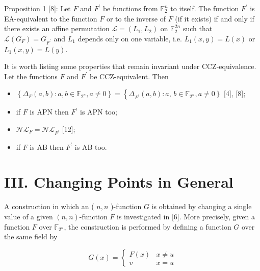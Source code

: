 \documentclass[10pt]{article}
\begin{document}
Proposition 1 [8]: Let $F$ and $F^{\prime}$ be functions from $\mathbb{F}_{2}^{n}$ to itself. The function $F^{\prime}$ is EA-equivalent to the function $F$ or to the inverse of $F$ (if it exists) if and only if there exists an affine permutation $\mathcal{L}=\left(L_{1}, L_{2}\right)$ on $\mathbb{F}_{2}^{2 n}$ such that $\mathcal{L}\left(G_{F}\right)=G_{F^{\prime}}$ and $L_{1}$ depends only on one variable, i.e. $L_{1}(x, y)=L(x)$ or $L_{1}(x, y)=L(y)$.

It is worth listing some properties that remain invariant under CCZ-equivalence. Let the functions $F$ and $F^{\prime}$ be CCZ-equivalent. Then

\begin{itemize}
  \item $\left\{\Delta_{F}(a, b): a, b \in \mathbb{F}_{2^{n}}, a \neq 0\right\}=\left\{\Delta_{F^{\prime}}(a, b): a\right.$, $\left.b \in \mathbb{F}_{2^{n}}, a \neq 0\right\}$ [4], [8];
  \item if $F$ is APN then $F^{\prime}$ is APN too;
  \item $\mathcal{N} \mathcal{L}_{F}=\mathcal{N} \mathcal{L}_{F^{\prime}}$ [12];
  \item if $F$ is AB then $F^{\prime}$ is AB too.
\end{itemize}

\section*{III. Changing Points in General}
A construction in which an ( $n, n$ )-function $G$ is obtained by changing a single value of a given $(n, n)$-function $F$ is investigated in [6]. More precisely, given a function $F$ over $\mathbb{F}_{2^{n}}$, the construction is performed by defining a function $G$ over the same field by

$$
G(x)= \begin{cases}F(x) & x \neq u \\ v & x=u\end{cases}
$$
\end{document}
